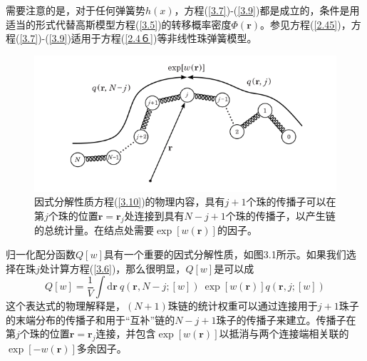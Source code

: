 需要注意的是，对于任何弹簧势$h(x)$，方程(\ref{3.7})-(\ref{3.9})都是成立的，条件是用适当的形式代替高斯模型方程(\ref{3.5})的转移概率密度$\Phi(\mathbf{r})$。参见方程(\ref{2.45})，方程(\ref{3.7})-(\ref{3.9})适用于方程(\ref{2.4６})等非线性珠弹簧模型。
\begin{figure}[H]
\centering
\includegraphics[scale=0.7]{./figures/Figure_1.png}
\caption{因式分解性质方程(\ref{3.10})的物理内容，具有$j+1$个珠的传播子可以在第$j$个珠的位置$\mathbf{r}=\mathbf{r}_j$处连接到具有$N-j+1$个珠的传播子，以产生链的总统计量。在结点处需要$\exp[w(\mathbf{r})]$的因子。}
\end{figure}
归一化配分函数$Q[w]$具有一个重要的因式分解性质，如图3.1所示。如果我们选择在珠$j$处计算方程(\ref{3.6})，那么很明显，$Q[w]$是可以成
\begin{equation}\label{3.10}
Q[w]=\frac{1}{V}\int\mathrm{d}\mathbf{r}~q(\mathbf{r},N-j;[w])~\exp[w(\mathbf{r})]q(\mathbf{r},j;[w])
\end{equation}
这个表达式的物理解释是，$(N+1)$珠链的统计权重可以通过连接用于$j+1$珠子的末端分布的传播子和用于“互补”链的$N-j+1$珠子的传播子来建立。传播子在第$j$个珠的位置$\mathbf{r}=\mathbf{r}_j$连接，并包含$\exp[w(\mathbf{r})]$以抵消与两个连接端相关联的$\exp[-w(\mathbf{r})]$多余因子。

